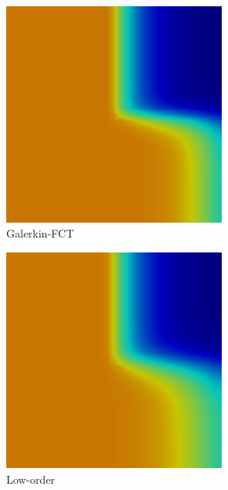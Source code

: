 \documentclass{beamer} \useoutertheme{infolines}
\begin{document}
\begin{frame}
\begin{figure}[h]
   \begin{subfigure}{0.3\textwidth}
      \includegraphics[width=0.8\textwidth]{./figures/GalFCT.png}
      \caption{Galerkin-FCT}
   \end{subfigure}
   \begin{subfigure}{0.3\textwidth}
      \includegraphics[width=0.8\textwidth]{./figures/low.png}
      \caption{Low-order}
   \end{subfigure}
   \begin{subfigure}{0.3\textwidth}

\end{subfigure}
\end{figure}
\end{frame}
\end{document}
